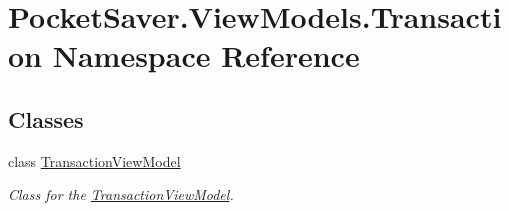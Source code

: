 \hypertarget{namespace_pocket_saver_1_1_view_models_1_1_transaction}{}\section{Pocket\+Saver.\+View\+Models.\+Transaction Namespace Reference}
\label{namespace_pocket_saver_1_1_view_models_1_1_transaction}
\subsection*{Classes}
\begin{DoxyCompactItemize}
\item 
class \hyperlink{class_pocket_saver_1_1_view_models_1_1_transaction_1_1_transaction_view_model}{Transaction\+View\+Model}
\begin{DoxyCompactList}\small\item\em Class for the \hyperlink{class_pocket_saver_1_1_view_models_1_1_transaction_1_1_transaction_view_model}{Transaction\+View\+Model}. \end{DoxyCompactList}\end{DoxyCompactItemize}
